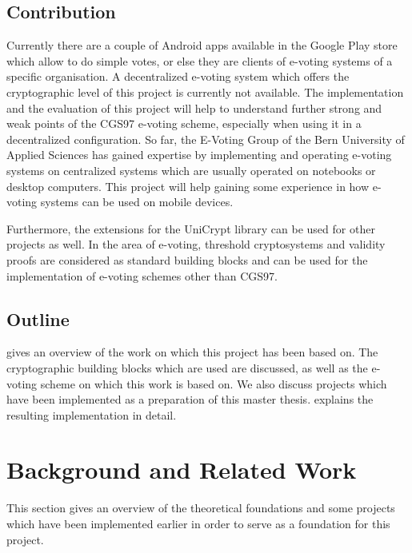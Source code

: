 \documentclass[numbers=noenddot, abstract=on, a4paper, headsepline,
footsepline, oneside, draft=off]{scrreprt}
\begin{document}
\section{Contribution}
\label{sec:contribution}
Currently there are a couple of Android apps available in the Google Play store
\cite{www:playstore} which allow to do simple votes, or else they are clients of e-voting
systems of a specific organisation. A decentralized e-voting system which offers the
cryptographic level of this project is currently not available. The
implementation and the evaluation of this project will help to understand
further strong and weak points of the CGS97 e-voting scheme, especially when
using it in a decentralized configuration. So far, the E-Voting Group of the
Bern University of Applied Sciences has gained expertise by implementing and
operating e-voting systems on centralized systems which are usually operated on
notebooks or desktop computers. This project will help gaining some experience
in how e-voting systems can be used on mobile devices.

Furthermore, the extensions for the UniCrypt library can be used for other
projects as well. In the area of e-voting, threshold cryptosystems and validity
proofs are considered as standard building blocks and can be used for the
implementation of e-voting schemes other than CGS97.

\section{Outline}
 gives an overview of the work on which this project has
been based on. The cryptographic building blocks which are used are discussed,
as well as the e-voting scheme on which this work is based on. We also discuss
projects which have been implemented as a preparation of this master thesis.
 explains the resulting implementation in detail.


\chapter{Background and Related Work}
\label{cha:brw}
This section gives an overview of the theoretical foundations and some projects
which have been implemented earlier in order to serve as a foundation for this
project. 
\end{document}
